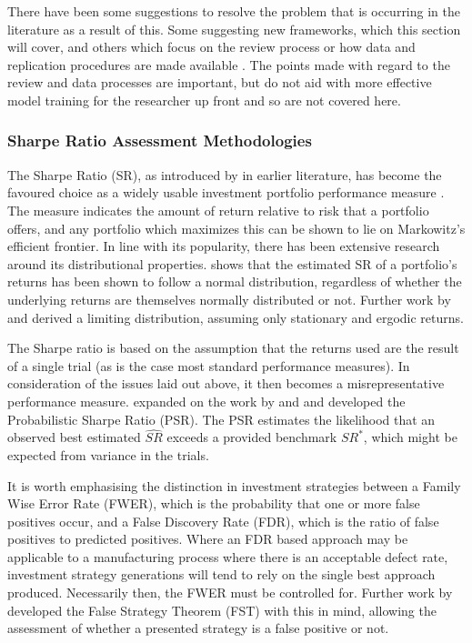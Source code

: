 \documentclass[a4paper,11pt,oneside]{article}
\theoremstyle{plain}
\theoremstyle{definition}
\begin{document}
	There have been some suggestions to resolve the problem that is occurring in the literature as a result of this. Some suggesting new frameworks, which this section will cover, and others which focus on the review process or 
	how data and replication procedures are made available \citep{Prado}. The points made with regard to the review and data processes are important, 
	but do not aid with more effective model training for the researcher up front and so are not covered here.
	
	\subsubsection{Sharpe Ratio Assessment Methodologies}\label{lr_backtest_sr}
	
	
	The Sharpe Ratio (SR), as introduced by \citet{Sharpe} in earlier literature, has become the favoured choice as a widely usable
	investment portfolio performance measure \citep{BaileyFrontier}. The measure indicates the amount of return relative to risk that a portfolio offers, and any portfolio which maximizes this can be shown to lie on Markowitz's efficient frontier. In line with its popularity, there has been 
	extensive research around its distributional properties. \citet{Lo} shows that the estimated SR of a portfolio's returns has been shown to follow a normal distribution, regardless
	of whether the underlying returns are themselves normally distributed or not. Further work by \citet{Christie} and \citet{Opdyke} derived a limiting distribution, assuming only stationary and ergodic returns.
		\hfill \break 
		
	The Sharpe ratio is based on the assumption that the returns used are the result of a single trial (as is the case most standard performance measures). In consideration of the issues laid out above, it then becomes a misrepresentative performance measure. \citet{BaileyFrontier} expanded on the work by \citet{Christie} and \citet{Opdyke} and developed the Probabilistic Sharpe Ratio (PSR). The PSR estimates the likelihood that an observed best estimated $\widehat{SR}$ exceeds a provided benchmark $SR^{*}$, which might be expected from variance in the trials. 
	\hfill \break 
	
	It is worth emphasising the distinction in investment strategies between a Family Wise Error Rate (FWER), which is the  probability that one or more false positives occur, and a False Discovery Rate (FDR), which is the ratio of false positives to predicted positives. Where an FDR based approach may be applicable to a manufacturing process where there is an acceptable defect rate, investment strategy generations will tend to rely on the single best approach produced. Necessarily then, the FWER must be controlled for. Further work by \citet{BaileySharpe} developed the False Strategy Theorem (FST) with this in mind, allowing the assessment of whether a presented strategy is a false positive or not.
		\hfill \break 
	
\end{document}
